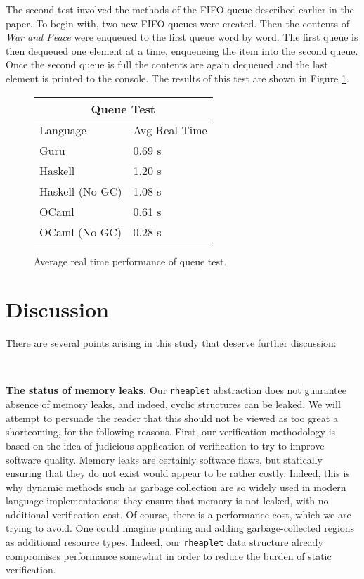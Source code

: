 \documentclass[9pt,natbib]{sigplanconf}
\begin{document}
The second test involved the methods of the FIFO queue described earlier in the paper.  To begin with, two new FIFO queues were created.  Then the contents of \textit{War and Peace} were enqueued to the first queue word by word.  The first queue is then dequeued one element at a time, enqueueing the item into the second queue.  Once the second queue is full the contents are again dequeued and the last element is printed to the console.  The results of this test are shown in Figure \ref{queuestats}.

\begin{figure}
\begin{tabular}{| l | l |}
\hline
\multicolumn{2}{|c|}{Queue Test} \\
\hline
Language & Avg Real Time \\
\hline
Guru & 0.69 s \\
Haskell & 1.20 s \\
Haskell (No GC) & 1.08 s \\
OCaml & 0.61 s \\
OCaml (No GC) & 0.28 s \\
\hline
\end{tabular}
\caption{Average real time performance of queue test.}
\label{queuestats}
\end{figure}

\section{Discussion}
\label{sec:future}

There are several points arising in this study that deserve further discussion:

\ 

\textbf{The status of memory leaks.} Our \texttt{rheaplet} abstraction
does not guarantee absence of memory leaks, and indeed, cyclic
structures can be leaked.  We will attempt to persuade the reader that
this should not be viewed as too great a shortcoming, for the
following reasons.  First, our verification methodology is based on
the idea of judicious application of verification to try to improve
software quality.  Memory leaks are certainly software flaws, but
statically ensuring that they do not exist would appear to be rather
costly.  Indeed, this is why dynamic methods such as garbage
collection are so widely used in modern language implementations: they
ensure that memory is not leaked, with no additional verification
cost.  Of course, there is a performance cost, which we are trying to
avoid.  One could imagine punting and adding garbage-collected regions
as additional resource types.  Indeed, our \texttt{rheaplet} data
structure already compromises performance somewhat in order to reduce
the burden of static verification.
\end{document}
